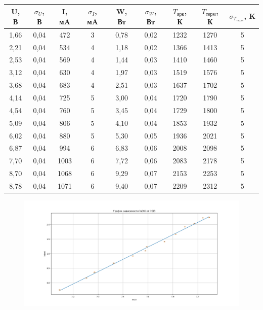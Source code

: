 \documentclass[a4paper,12pt]{article}
\begin{document}
\begin{table}[H]
    \centering
    \begin{tabular}{|c|c|c|c|c|c|c|c|c|}
        \hline
        U, В & $\sigma_U$, В & I, мA & $\sigma_I$, мA & W, Вт & $\sigma_W$, Вт & $T_\text{ярк}$, К & $T_\text{терм}$, К & $\sigma_{T_\text{терм}}$, K \\
        \hline 
        1,66 & 0,04 & 472  & 3 & 0,78 & 0,02 & 1232 & 1270 & 5 \\
        \hline
        2,21 & 0,04 & 534  & 4 & 1,18 & 0,02 & 1366 & 1413 & 5 \\
        \hline
        2,53 & 0,04 & 569  & 4 & 1,44 & 0,03 & 1410 & 1460 & 5 \\
        \hline
        3,12 & 0,04 & 630  & 4 & 1,97 & 0,03 & 1519 & 1576 & 5 \\
        \hline
        3,68 & 0,04 & 683  & 4 & 2,51 & 0,03 & 1637 & 1702 & 5 \\
        \hline
        4,14 & 0,04 & 725  & 5 & 3,00 & 0,04 & 1720 & 1790 & 5 \\
        \hline
        4,54 & 0,04 & 760  & 5 & 3,45 & 0,04 & 1729 & 1800 & 5 \\
        \hline
        5,09 & 0,04 & 806  & 5 & 4,10 & 0,04 & 1853 & 1932 & 5 \\
        \hline
        6,02 & 0,04 & 880  & 5 & 5,30 & 0,05 & 1936 & 2021 & 5 \\
        \hline
        6,87 & 0,04 & 994  & 6 & 6,83 & 0,06 & 2008 & 2098 & 5 \\
        \hline
        7,70 & 0,04 & 1003 & 6 & 7,72 & 0,06 & 2083 & 2178 & 5 \\
        \hline
        8,70 & 0,04 & 1068 & 6 & 9,29 & 0,07 & 2153 & 2253 & 5 \\
        \hline
        8,78 & 0,04 & 1071 & 6 & 9,40 & 0,07 & 2209 & 2312 & 5 \\
        \hline
    \end{tabular}
\end{table}

\begin{figure}[H]
    \centering
    \includegraphics[scale=0.5]{graph1.png}
\end{figure}
\end{document}
